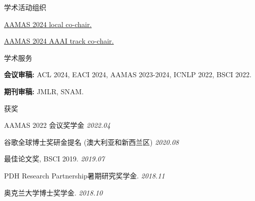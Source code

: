 \documentclass{resume} %
\begin{document}
\begin{rSection}{学术活动组织}
	\begin{rSubsection}{}{}{}{}
		\item \href{https://www.aamas2024-conference.auckland.ac.nz/organization/organizing-committee/}{AAMAS 2024 local co-chair.}
		\item \href{https://www.aamas2024-conference.auckland.ac.nz/organization/organizing-committee/}{AAMAS 2024 AAAI track co-chair.}
	\end{rSubsection}
\end{rSection}

\begin{rSection}{学术服务}
	\begin{rSubsection}{}{}{}{}
		\item {\bf 会议审稿:} ACL 2024, EACI 2024, AAMAS 2023-2024, ICNLP 2022, BSCI 2022.
		\item {\bf 期刊审稿:} JMLR, SNAM.
	\end{rSubsection}
\end{rSection}


\begin{rSection}{获奖}
\begin{rSubsection}{}{}{}{}
\item AAMAS 2022 会议奖学金 \hfill {\em 2022.04}
\item 谷歌全球博士奖研金提名 (澳大利亚和新西兰区) \hfill {\em 2020.08}
\item 最佳论文奖, BSCI 2019. \hfill {\em 2019.07}
\item PDH Research Partnership暑期研究奖学金. \hfill {\em 2018.11}
\item 奥克兰大学博士奖学金. \hfill {\em 2018.10}
\end{rSubsection}
\end{rSection}
\end{document}
